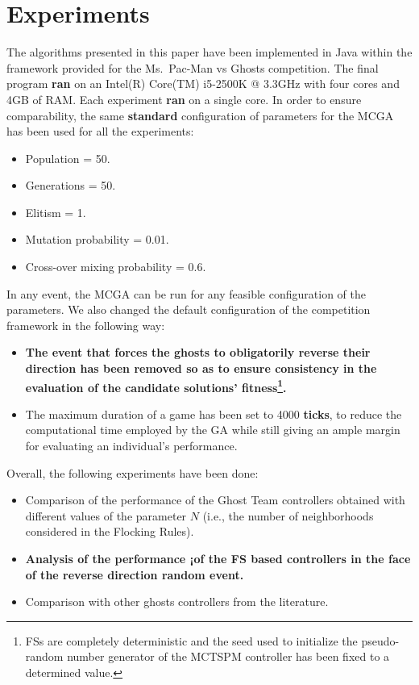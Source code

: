 \documentclass[journal]{IEEEtran}
\begin{document}
\section{Experiments}
\label{sec:Experiments}
The algorithms presented in this paper have been implemented in Java within the framework provided for the Ms.\  Pac-Man vs Ghosts competition. The final program \textbf{ran} on an Intel(R) Core(TM) i5-2500K @ 3.3GHz with four cores and 4GB of RAM. Each experiment \textbf{ran} on a single core. In order to ensure comparability, the same \textbf{standard} configuration of parameters for the MCGA has been used for all the experiments:

\begin{itemize}
  \item Population = 50.
  \item Generations = 50.
  \item Elitism = 1.
  \item Mutation probability = 0.01.
  \item Cross-over mixing probability = 0.6.
\end{itemize}

In any event, the MCGA can be run for any feasible configuration of the parameters. We also changed the default configuration of the competition framework in the following way:

\begin{itemize}
  \item \textbf{The event that forces the ghosts to obligatorily reverse their direction has been removed so as to ensure consistency in the evaluation of the candidate solutions' fitness\footnote{FSs are completely deterministic and the seed used to initialize the pseudo-random number generator of the MCTSPM controller has been fixed to a determined value.}.}
  \item The maximum duration of a game has been set to 4000 \textbf{ticks}, to reduce the computational time employed by the GA while still giving an ample margin for evaluating an individual's performance.
\end{itemize}

Overall, the following experiments have been done:

\begin{itemize}
  \item Comparison of the performance of the Ghost Team controllers obtained with different values of the parameter $N$ (i.e., the number of neighborhoods considered in the Flocking Rules).
  \item \textbf{Analysis of the performance ¡of the FS based controllers in the face of the reverse direction random event.}
  \item Comparison with other ghosts controllers from the literature.
\end{itemize}
\end{document}
